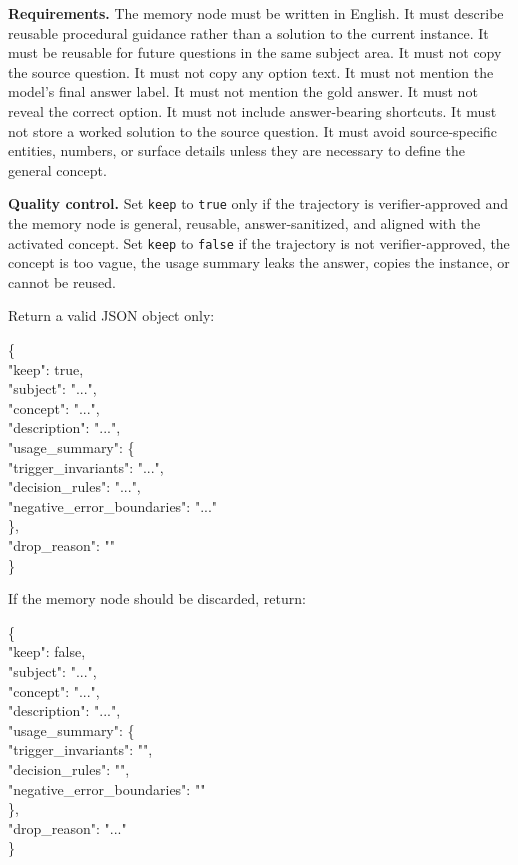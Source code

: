 \documentclass[11pt]{article}
\newenvironment{promptcontbox}{%
    \par
    \begingroup\scriptsize\noindent
  }{%
    \par\endgroup\medskip
  }
\begin{document}
\begin{promptcontbox}
\textbf{Requirements.}
The memory node must be written in English.
It must describe reusable procedural guidance rather than a solution to the current instance.
It must be reusable for future questions in the same subject area.
It must not copy the source question.
It must not copy any option text.
It must not mention the model's final answer label.
It must not mention the gold answer.
It must not reveal the correct option.
It must not include answer-bearing shortcuts.
It must not store a worked solution to the source question.
It must avoid source-specific entities, numbers, or surface details unless they are necessary to define the general concept.

\textbf{Quality control.}
Set \texttt{keep} to \texttt{true} only if the trajectory is verifier-approved and the memory node is general, reusable, answer-sanitized, and aligned with the activated concept.
Set \texttt{keep} to \texttt{false} if the trajectory is not verifier-approved, the concept is too vague, the usage summary leaks the answer, copies the instance, or cannot be reused.
\end{promptcontbox}

\begin{promptcontbox}
Return a valid JSON object only:
{\ttfamily\scriptsize
\noindent \{\\
\quad "keep": true,\\
\quad "subject": "...",\\
\quad "concept": "...",\\
\quad "description": "...",\\
\quad "usage\_summary": \{\\
\quad\quad "trigger\_invariants": "...",\\
\quad\quad "decision\_rules": "...",\\
\quad\quad "negative\_error\_boundaries": "..."\\
\quad \},\\
\quad "drop\_reason": ""\\
\}
\par
}
\end{promptcontbox}

\begin{promptcontbox}
If the memory node should be discarded, return:
{\ttfamily\scriptsize
\noindent \{\\
\quad "keep": false,\\
\quad "subject": "...",\\
\quad "concept": "...",\\
\quad "description": "...",\\
\quad "usage\_summary": \{\\
\quad\quad "trigger\_invariants": "",\\
\quad\quad "decision\_rules": "",\\
\quad\quad "negative\_error\_boundaries": ""\\
\quad \},\\
\quad "drop\_reason": "..."\\
\}
\par
}
\end{promptcontbox}
\end{document}
